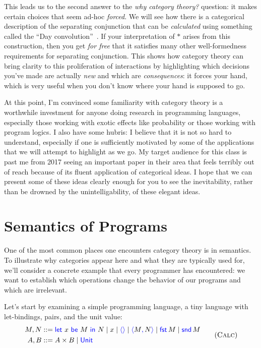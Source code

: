 This leads us to the second answer to the \emph{why category theory?}
question: it makes certain choices that seem ad-hoc \emph{forced}.  We will see
how there is a categorical description of the separating
conjunction that can be \emph{calculated} using something called the ``Day
convolution''~\citep{dongol2016convolution,biering2007bi}.
If your 
interpretation of $*$ arises from this construction, then you get \emph{for free}
that it satisfies many other well-formedness requirements for separating conjunction.
This shows how category 
theory can bring clarity to this 
proliferation of interactions by highlighting which decisions you've made 
are actually \emph{new} and which are \emph{consequences}: it forces your hand,
which is very useful when you don't know where your hand is supposed to go.

At this point, I'm convinced some familiarity with category theory 
is a worthwhile investment for anyone doing research in programming 
languages, especially those working with exotic effects like 
probability or those working with program logics. I also have some hubris: 
I believe that it is not so hard to understand, especially if one 
is sufficiently motivated by some of the applications that we will 
attempt to highlight as we go.
My target audience for this class is past me from 2017 seeing an important 
paper in their area that feels terribly out of reach because of its 
fluent application of categorical ideas. I hope that we can 
present some of these ideas clearly enough for you to see the inevitability, 
rather than be drowned by the unintelligability, of these elegant ideas.

\chapter{Semantics of Programs} \label{sec:semantics-of-programs}

One of the most common places one encounters category theory is in semantics. To
illustrate why categories appear here and what they are typically used for,
we'll consider a concrete example that every programmer has encountered: 
we want to establish which operations change the behavior of our programs
and which are irrelevant.

Let's start by examining a simple programming language, a tiny language 
with let-bindings, pairs, and the unit value:
\begin{gather}
  \begin{aligned}
  M,N &::= \pllet{x}{M}{N} \mid x \mid \plunit{} \mid \plpair{M}{N} \mid \plfst{M} \mid \plsnd{M} \\
  A,B &::= A \times B \mid \plUnit
  \end{aligned}
  \tag{\textsc{Calc}}
  \label{lang:calc}
\end{gather}

